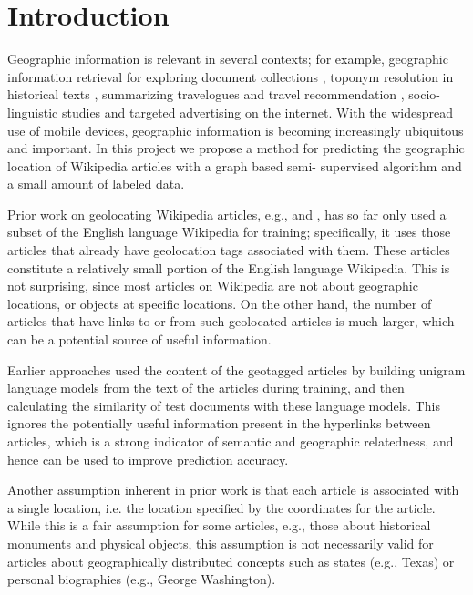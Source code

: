 \section{Introduction}

Geographic information is relevant in several contexts; for example,
geographic information retrieval for exploring document collections
\cite{ding2000computing}, toponym resolution in historical texts
\cite{smith2001disambiguating}, summarizing travelogues and travel
recommendation \cite{hao-et-al:10}, socio-linguistic studies
\cite{eisenstein-smith-xing:11} and targeted advertising on the internet.  With
the widespread use of mobile devices, geographic information is becoming
increasingly ubiquitous and important.  In this project we propose a method for
predicting the geographic location of Wikipedia articles with a graph based
semi- supervised algorithm and a small amount of labeled data.

\par Prior work on geolocating Wikipedia articles, e.g.,
\cite{wing-baldridge:11} and  \cite{rolleretal:12}, has so far only used a
subset of the English language Wikipedia for training; specifically, it uses
those articles that already have geolocation tags associated with them.  These
articles constitute a relatively small portion of the English language
Wikipedia.    This is not surprising, since most
articles on Wikipedia are not about geographic locations, or objects at
specific locations. On the other hand, the number of articles that have links
to or from such geolocated articles is much larger, which can be a potential
source of useful information. 

\par Earlier approaches used the content of the geotagged articles by building
unigram language models from the text of the articles during training, and
then calculating the similarity of test documents with these language models.
This ignores the potentially useful information present in the hyperlinks
between articles, which is a strong indicator of semantic and geographic
relatedness, and hence can be used to improve prediction accuracy.

\par Another assumption inherent in prior work is that each article is
associated with a single location, i.e. the location specified by the
coordinates for the article. While this is a fair assumption for some
articles, e.g., those about historical monuments and physical objects, this
assumption is not necessarily valid for articles about geographically
distributed concepts such as states (e.g., Texas) or personal biographies
(e.g., George Washington).

